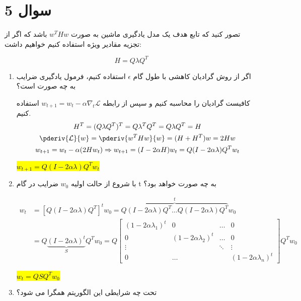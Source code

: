 \section{سوال 5}

تصور کنید که تابع هدف یک مدل یادگیری ماشین به صورت $w^THw$ باشد که اگر از تجزیه
مقادیر ویژه استفاده کنیم خواهیم داشت:

\[
	H=Q\lambda Q^T
\]

\begin{enumerate}
	\item {
	      اگر از روش گرادیان کاهشی با طول گام $\epsilon$ استفاده کنیم، فرمول یادگیری ضرایب به چه صورت است؟

	      \begin{qsolve}[]
		      کافیست گرادیان را محاسبه کنیم و سپس از رابطه $w_{t+1}= w_t-\alpha \nabla_t\mathcal{L} $ استفاده کنیم.
		      \begin{gather*}
			      H^T=(Q\lambda Q^T)^T = Q\lambda^T Q^T = Q\lambda Q^T = H\\
			      \pderiv{\mathcal{L}}{w}=\pderiv{w^THw}{w}=(H+H^T)w=2Hw\\
			      w_{t+1} =w_t - \alpha(2Hw_t)\Rightarrow w_{t+1}= (I-2\alpha H)w_t=Q(I-2\alpha \lambda)Q^T w_t
		      \end{gather*}
		      \centerline{\hl{$w_{t+1}=Q(I-2\alpha \lambda)Q^T w_t$}}
	      \end{qsolve}
	      }
	\item {
	      با شروع از حالت اولیه $w_0$ ضرایب در گام t به چه صورت خواهد بود؟

	      \begin{qsolve}[]
		      \begin{align*}
			      w_t & =\left[Q(I-2\alpha \lambda)Q^T\right]^tw_0=\overbrace{Q(I-2\alpha \lambda)Q^T\dots Q(I-2\alpha \lambda)Q^T}^tw_0 \\
			          & =Q\underbrace{(I-2\alpha\lambda)^t}_{S}Q^Tw_0
			      =Q\begin{bmatrix}
				        (1-2\alpha\lambda_1)^t & 0                      & \dots  & 0                      \\
				        0                      & (1-2\alpha\lambda_2)^t & \dots  & 0                      \\
				        \vdots                 &                        & \ddots & \vdots                 \\
				        0                      & \dots                  &        & (1-2\alpha\lambda_n)^t
			        \end{bmatrix}Q^Tw_0
		      \end{align*}
		      \centerline{\hl{$w_t=QSQ^Tw_0$}}
	      \end{qsolve}
	      }
	\item {
	      تحت چه شرایطی این الگوریتم همگرا می شود؟

}
\end{enumerate}
